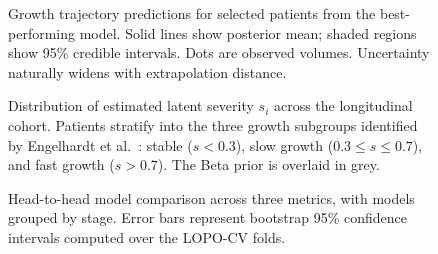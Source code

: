\begin{figure}[H]
  \centering
  \caption{Growth trajectory predictions for selected patients from the
    best-performing model. Solid lines show posterior mean; shaded regions
    show 95\% credible intervals. Dots are observed volumes. Uncertainty
    naturally widens with extrapolation distance.}
  \label{fig:trajectory_predictions}
\end{figure}

\begin{figure}[H]
  \centering
  \caption{Distribution of estimated latent severity $s_i$ across the
    longitudinal cohort. Patients stratify into the three growth subgroups
    identified by Engelhardt et al.\ \cite{engelhardt2023gompertz}: stable
    ($s < 0.3$), slow growth ($0.3 \leq s \leq 0.7$), and fast growth
    ($s > 0.7$). The Beta prior is overlaid in grey.}
  \label{fig:severity_distribution}
\end{figure}

\begin{figure}[H]
  \centering
  \caption{Head-to-head model comparison across three metrics, with models
    grouped by stage. Error bars represent bootstrap 95\% confidence
    intervals computed over the LOPO-CV folds.}
  \label{fig:model_comparison}
\end{figure}

